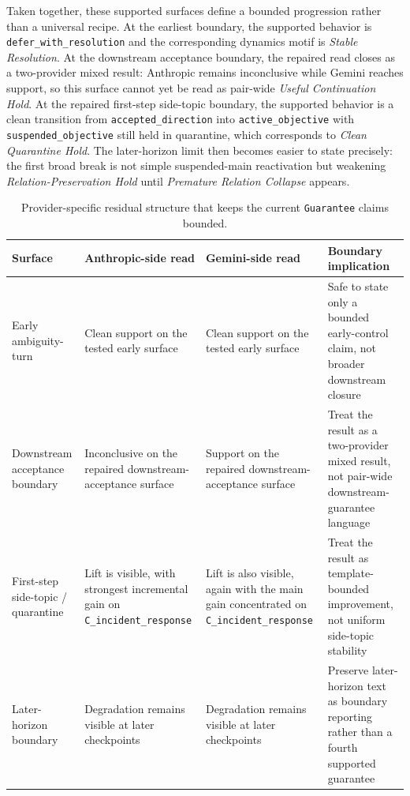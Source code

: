 \documentclass[11pt]{article}
\begin{document}
Taken together, these supported surfaces define a bounded progression rather than
a universal recipe. At the earliest boundary, the supported behavior is
\texttt{defer\_with\_resolution} and the corresponding dynamics motif is
\textit{Stable Resolution}. At the downstream acceptance boundary, the repaired
read closes as a two-provider mixed result: Anthropic remains inconclusive
while Gemini reaches support, so this surface cannot yet be read as pair-wide
\textit{Useful Continuation Hold}. At the repaired first-step
side-topic boundary, the supported behavior is a clean transition from
\texttt{accepted\_direction} into \texttt{active\_objective} with
\texttt{suspended\_objective} still held in quarantine, which corresponds to
\textit{Clean Quarantine Hold}. The later-horizon limit then becomes easier to
state precisely: the first broad break is not simple suspended-main reactivation
but weakening \textit{Relation-Preservation Hold} until \textit{Premature
Relation Collapse} appears.

\begin{table}[ht]
\centering
\begin{tabular}{|p{}|p{}|p{}|p{}|}
\hline
\textbf{Surface} & \textbf{Anthropic-side read} & \textbf{Gemini-side read} & \textbf{Boundary implication} \\
\hline
Early ambiguity-turn & Clean support on the tested early surface & Clean support on the tested early surface & Safe to state only a bounded early-control claim, not broader downstream closure \\
\hline
Downstream acceptance boundary & Inconclusive on the repaired downstream-acceptance surface & Support on the repaired downstream-acceptance surface & Treat the result as a two-provider mixed result, not pair-wide downstream-guarantee language \\
\hline
First-step side-topic / quarantine & Lift is visible, with strongest incremental gain on \texttt{C\_incident\_response} & Lift is also visible, again with the main gain concentrated on \texttt{C\_incident\_response} & Treat the result as template-bounded improvement, not uniform side-topic stability \\
\hline
Later-horizon boundary & Degradation remains visible at later checkpoints & Degradation remains visible at later checkpoints & Preserve later-horizon text as boundary reporting rather than a fourth supported guarantee \\
\hline
\end{tabular}
\caption{Provider-specific residual structure that keeps the current
\texttt{Guarantee} claims bounded.}
\end{table}
\end{document}
